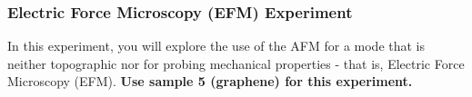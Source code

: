 \documentclass{../lab}
\begin{document}




\subsubsection{Electric Force Microscopy (EFM) Experiment}
\label{subsec:EFM}

In this experiment, you will explore the use of the AFM for a mode that is neither topographic nor for probing mechanical properties - that is, Electric Force Microscopy (EFM). \textbf{Use sample 5 (graphene) for this experiment.}
\end{document}
